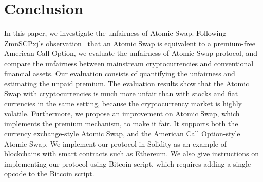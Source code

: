 \section{Conclusion}
\label{sec:conclusion}


In this paper, we investigate the unfairness of Atomic Swap.
Following ZmnSCPxj's observation~\cite{optionality-origin} that an Atomic Swap is equivalent to a premium-free American Call Option, we evaluate the unfairness of Atomic Swap protocol, and compare the unfairness between mainstream cryptocurrencies and conventional financial assets.
Our evaluation consists of quantifying the unfairness and estimating the unpaid premium.
The evaluation results show that the Atomic Swap with cryptocurrencies is much more unfair than with stocks and fiat currencies in the same setting, because the cryptocurrency market is highly volatile.
Furthermore, we propose an improvement on Atomic Swap, which implements the premium mechanism, to make it fair.
It supports both the currency exchange-style Atomic Swap, and the American Call Option-style Atomic Swap.
We implement our protocol in Solidity as an example of blockchains with smart contracts such as Ethereum.
We also give instructions on implementing our protocol using Bitcoin script, which requires adding a single opcode to the Bitcoin script.